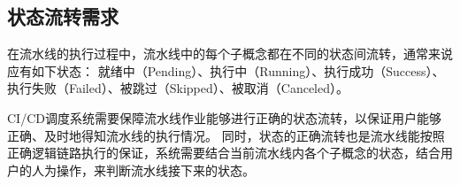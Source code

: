 





\subsection{状态流转需求}
在流水线的执行过程中，流水线中的每个子概念都在不同的状态间流转，通常来说应有如下状态：
就绪中（Pending）、执行中（Running）、执行成功（Success）、执行失败（Failed）、被跳过（Skipped）、被取消（Canceled）。

CI/CD调度系统需要保障流水线作业能够进行正确的状态流转，以保证用户能够正确、及时地得知流水线的执行情况。
同时，状态的正确流转也是流水线能按照正确逻辑链路执行的保证，系统需要结合当前流水线内各个子概念的状态，结合用户的人为操作，来判断流水线接下来的状态。

